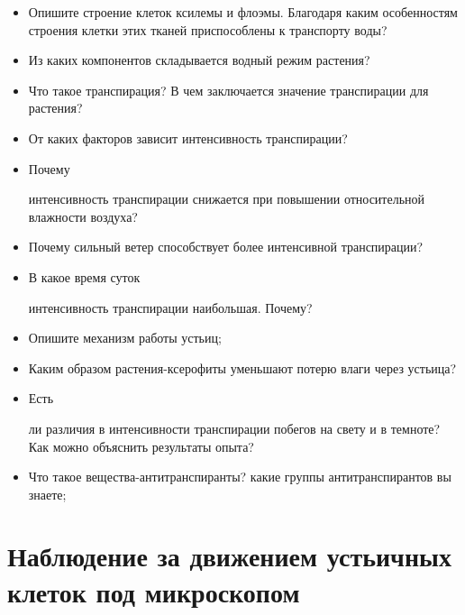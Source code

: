 	\begin{itemize}
		\item Опишите строение клеток \hypertarget{xsilema_tisue}{ксилемы и флоэмы}. Благодаря каким особенностям строения клетки этих тканей приспособлены к транспорту воды?
		\item Из каких компонентов складывается водный режим растения?
		\item Что такое \hypertarget{transpiration_question}{транспирация}? В чем заключается значение транспирации для растения?
		\item От каких факторов зависит \hypertarget{transpiration_intensivity}{интенсивность транспирации}?
		\item \hypertarget{transpiration_air_humidity}{Почему} интенсивность транспирации снижается при повышении относительной влажности воздуха?
		\item Почему сильный ветер способствует более интенсивной транспирации?
		\item \hypertarget{transpiration_time}{В какое время суток} интенсивность транспирации наибольшая. Почему?
		\item Опишите механизм работы устьиц;
		\item Каким образом растения-ксерофиты уменьшают потерю влаги через устьица?
		\item \hypertarget{light_dark_diferences}{Есть} ли различия в интенсивности транспирации побегов на свету и в темноте? Как можно объяснить результаты опыта?
		\item Что такое вещества-антитранспиранты? какие группы антитранспирантов вы знаете;
	\end{itemize}

\section*{\lbtitle Наблюдение за движением устьичных клеток под микроскопом} 



